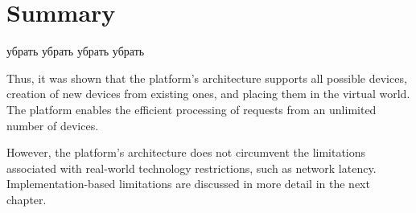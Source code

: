 \section{Summary}

убрать
убрать
убрать
убрать


Thus, it was shown that the platform's architecture supports all possible devices, creation of new devices from existing ones, and placing them in the virtual world. The platform enables the efficient processing of requests from an unlimited number of devices.


However, the platform's architecture does not circumvent the limitations associated with real-world technology restrictions, such as network latency. Implementation-based limitations are discussed in more detail in the next chapter.

